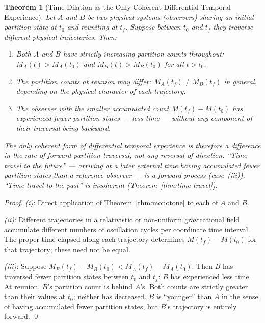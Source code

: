 \documentclass[twocolumn,10pt,a4paper]{article}
\theoremstyle{thmstyle}
\newtheorem{theorem}{Theorem}[section]
\theoremstyle{definition}
\theoremstyle{remark}
\begin{document}
\begin{theorem}[Time Dilation as the Only Coherent Differential Temporal Experience]
\label{thm:time-dilation}
Let $A$ and $B$ be two physical systems (observers) sharing an initial partition state at $t_0$ and reuniting at $t_f$. Suppose between $t_0$ and $t_f$ they traverse different physical trajectories. Then:
\begin{enumerate}[leftmargin=1.5em,label=(\roman*),itemsep=0.2em]
\item Both $A$ and $B$ have strictly increasing partition counts throughout: $M_A(t) > M_A(t_0)$ and $M_B(t) > M_B(t_0)$ for all $t > t_0$.
\item The partition counts at reunion may differ: $M_A(t_f) \neq M_B(t_f)$ in general, depending on the physical character of each trajectory.
\item The observer with the smaller accumulated count $M(t_f) - M(t_0)$ has experienced fewer partition states --- less time --- without any component of their traversal being backward.
\end{enumerate}
The only coherent form of differential temporal experience is therefore a difference in the \emph{rate} of forward partition traversal, not any reversal of direction. ``Time travel to the future'' --- arriving at a later external time having accumulated fewer partition states than a reference observer --- is a forward process (case~(iii)). ``Time travel to the past'' is incoherent (Theorem~\ref{thm:time-travel}).
\end{theorem}

\begin{proof}
\textit{(i)}: Direct application of Theorem~\ref{thm:monotone} to each of $A$ and $B$.

\textit{(ii)}: Different trajectories in a relativistic or non-uniform gravitational field accumulate different numbers of oscillation cycles per coordinate time interval. The proper time elapsed along each trajectory determines $M(t_f) - M(t_0)$ for that trajectory; these need not be equal.

\textit{(iii)}: Suppose $M_B(t_f) - M_B(t_0) < M_A(t_f) - M_A(t_0)$. Then $B$ has traversed fewer partition states between $t_0$ and $t_f$: $B$ has experienced less time. At reunion, $B$'s partition count is behind $A$'s. Both counts are strictly greater than their values at $t_0$; neither has decreased. $B$ is ``younger'' than $A$ in the sense of having accumulated fewer partition states, but $B$'s trajectory is entirely forward. \qed
\end{proof}
\end{document}
